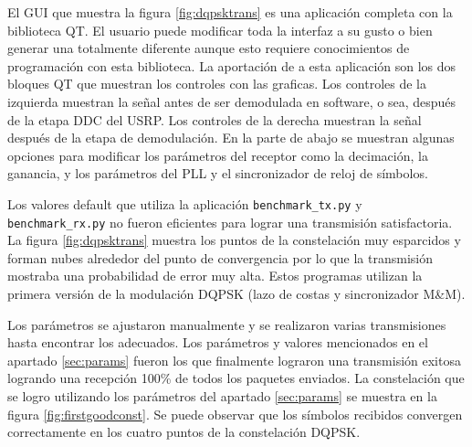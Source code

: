 El GUI que muestra la figura \ref{fig:dqpsktrans} es una aplicaci\'on completa con la biblioteca QT.
El usuario puede modificar toda la interfaz a su gusto o bien generar una totalmente diferente aunque
esto requiere conocimientos de programaci\'on con esta biblioteca. La aportaci\'on de \gnuradio a
esta aplicaci\'on son los dos bloques QT que muestran los controles con las graficas. Los controles
de la izquierda muestran la se\~nal antes de ser demodulada en software, o sea, despu\'es de la
etapa DDC del USRP. Los controles de la derecha muestran la se\~nal despu\'es de la etapa de
demodulaci\'on. En la parte de abajo se muestran algunas opciones para modificar los par\'ametros
del receptor como la decimaci\'on, la ganancia, y los par\'ametros del PLL y el sincronizador de
reloj de s\'imbolos.

Los valores default que utiliza la aplicaci\'on \verb|benchmark_tx.py| y \\
\verb|benchmark_rx.py| no fueron eficientes para lograr una transmisi\'on satisfactoria. La figura
\ref{fig:dqpsktrans} muestra los puntos de la constelaci\'on muy esparcidos y forman nubes alrededor
del punto de convergencia por lo que la transmisi\'on mostraba una probabilidad de error muy alta.
Estos programas utilizan la primera versi\'on de la modulaci\'on DQPSK (lazo de costas y sincronizador
M\&M).

Los par\'ametros se ajustaron manualmente y se realizaron varias transmisiones hasta encontrar
los adecuados. Los par\'ametros y valores mencionados en el apartado \ref{sec:params} fueron los que
finalmente lograron una transmisi\'on exitosa logrando una recepci\'on 100\% de todos los paquetes
enviados. La constelaci\'on que se logro utilizando los par\'ametros del apartado \ref{sec:params}
se muestra en la figura \ref{fig:firstgoodconst}. Se puede observar que los s\'imbolos recibidos
convergen correctamente en los cuatro puntos de la constelaci\'on DQPSK.

